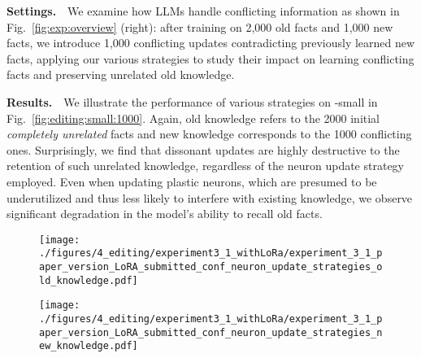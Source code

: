 \textbf{Settings.}\ \  We examine how LLMs handle conflicting information as shown in Fig.~\ref{fig:exp:overview} (right): after training on 2,000 old facts and 1,000 new facts, we introduce 1,000 conflicting updates contradicting previously learned new facts, applying our various strategies to study their impact on learning conflicting facts and preserving unrelated old knowledge.


\textbf{Results.}\ \   We illustrate the performance of various strategies on \gpttwo-small in Fig.~\ref{fig:editing:small:1000}. Again, old knowledge refers to the 2000 initial \textit{completely unrelated} facts and new knowledge corresponds to the 1000 conflicting ones. Surprisingly, we find that dissonant updates are highly destructive to the retention of such unrelated knowledge, regardless of the neuron update strategy employed. Even when updating plastic neurons, which are presumed to be underutilized and thus less likely to interfere with existing knowledge, we observe significant degradation in the model's ability to recall old facts.

\begin{figure*}[t]
    \centering
    \begin{subfigure}[b]{0.45\textwidth}
        \centering
        \texttt{[image: ./figures/4\_editing/experiment3\_1\_withLoRa/experiment\_3\_1\_paper\_version\_LoRA\_submitted\_conf\_neuron\_update\_strategies\_old\_knowledge.pdf]}
    \end{subfigure}
    \begin{subfigure}[b]{0.45\textwidth}
        \centering
        \texttt{[image: ./figures/4\_editing/experiment3\_1\_withLoRa/experiment\_3\_1\_paper\_version\_LoRA\_submitted\_conf\_neuron\_update\_strategies\_new\_knowledge.pdf]}
    \end{subfigure}
    \caption{\textit{Dissonant updates}: Impact of 1000 dissonant facts and \gpttwo-small (see Fig.~\ref{fig:knowledge_editing_performance} for \gpttwo-XL)} \label{fig:editing:small:1000}
\end{figure*}

